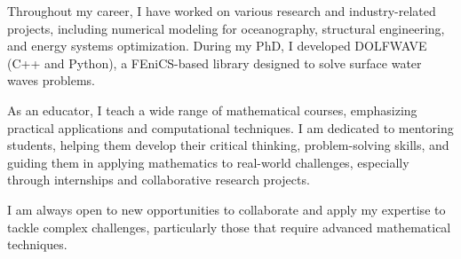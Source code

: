 \documentclass[a4paper,11pt]{article}
\begin{document}
Throughout my career, I have worked on various research and industry-related projects, including numerical modeling for oceanography, structural engineering, and energy systems optimization. During my PhD, I developed DOLFWAVE (C++ and Python), a FEniCS-based library designed to solve surface water waves problems.

As an educator, I teach a wide range of mathematical courses, emphasizing practical applications and computational techniques. I am dedicated to mentoring students, helping them develop their critical thinking, problem-solving skills, and guiding them in applying mathematics to real-world challenges, especially through internships and collaborative research projects.

I am always open to new opportunities to collaborate and apply my expertise to tackle complex challenges, particularly those that require advanced mathematical techniques.
\end{document}
